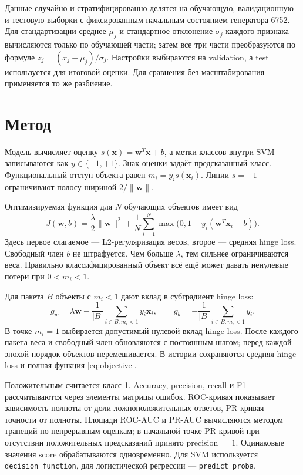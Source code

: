 \documentclass[a4paper,12pt]{article}
\begin{document}
Данные случайно и стратифицированно делятся на обучающую, валидационную и тестовую выборки с фиксированным начальным состоянием генератора 6752. Для стандартизации среднее $\mu_j$ и стандартное отклонение $\sigma_j$ каждого признака вычисляются только по обучающей части; затем все три части преобразуются по формуле $z_j=(x_j-\mu_j)/\sigma_j$. Настройки выбираются на validation, а test используется для итоговой оценки. Для сравнения без масштабирования применяется то же разбиение.

\section{Метод}
Модель вычисляет оценку $s(\mathbf{x})=\mathbf{w}^{T}\mathbf{x}+b$, а метки классов внутри SVM записываются как $y\in\{-1,+1\}$. Знак оценки задаёт предсказанный класс. Функциональный отступ объекта равен $m_i=y_i s(\mathbf{x}_i)$. Линии $s=\pm1$ ограничивают полосу шириной $2/\lVert\mathbf w\rVert$.

Оптимизируемая функция для $N$ обучающих объектов имеет вид
\begin{equation}\label{eq:objective}
J(\mathbf w,b)=\frac{\lambda}{2}\lVert\mathbf w\rVert^2+\frac1N\sum_{i=1}^{N}\max\bigl(0,1-y_i(\mathbf w^T\mathbf x_i+b)\bigr).
\end{equation}
Здесь первое слагаемое — L2-регуляризация весов, второе — средняя hinge loss. Свободный член $b$ не штрафуется. Чем больше $\lambda$, тем сильнее ограничиваются веса. Правильно классифицированный объект всё ещё может давать ненулевые потери при $0<m_i<1$.

Для пакета $B$ объекты с $m_i<1$ дают вклад в субградиент hinge loss:
\begin{equation}\label{eq:gradient}
g_w=\lambda\mathbf w-\frac{1}{|B|}\sum_{i\in B:m_i<1}y_i\mathbf x_i,\qquad
g_b=-\frac{1}{|B|}\sum_{i\in B:m_i<1}y_i.
\end{equation}
В точке $m_i=1$ выбирается допустимый нулевой вклад hinge loss. После каждого пакета веса и свободный член обновляются с постоянным шагом; перед каждой эпохой порядок объектов перемешивается. В истории сохраняются средняя hinge loss и полная функция \eqref{eq:objective}.

Положительным считается класс 1. Accuracy, precision, recall и F1 рассчитываются через элементы матрицы ошибок. ROC-кривая показывает зависимость полноты от доли ложноположительных ответов, PR-кривая — точности от полноты. Площади ROC-AUC и PR-AUC вычисляются методом трапеций по непрерывным оценкам; в начальной точке PR-кривой при отсутствии положительных предсказаний принято precision $=1$. Одинаковые значения score обрабатываются одновременно. Для SVM используется \texttt{decision\_function}, для логистической регрессии — \texttt{predict\_proba}.
\end{document}
